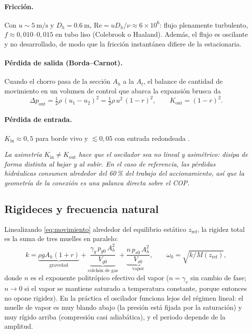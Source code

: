 \documentclass[11pt,a4paper]{article}
\newenvironment{nota}{\par\smallskip\noindent\begin{minipage}{\linewidth}\small\itshape}{\end{minipage}\par\smallskip}
\begin{document}
\paragraph{Fricción.} Con $u\sim\SI{5}{\metre\per\second}$ y $D_h=\SI{0.6}{\metre}$, $\mathrm{Re}=uD_h/\nu\approx 6\times10^{6}$: flujo plenamente turbulento, $f\approx 0{,}010$--$0{,}015$ en tubo liso (Colebrook o Haaland). Además, el flujo es oscilante y no desarrollado, de modo que la fricción instantánea difiere de la estacionaria.

\paragraph{Pérdida de salida (Borda--Carnot).} Cuando el chorro pasa de la sección $A_h$ a la $A_t$, el balance de cantidad de movimiento en un volumen de control que abarca la expansión brusca da
\begin{equation}
\Delta p_{\mathrm{out}} = \tfrac12\rho\,(u_1-u_2)^2 = \tfrac12\rho\,u^2\,(1-r)^2,\qquad K_{\mathrm{out}}=(1-r)^2 .
\end{equation}
\paragraph{Pérdida de entrada.} $K_{\mathrm{in}}\approx 0{,}5$ para borde vivo y $\lesssim 0{,}05$ con entrada redondeada \cite{idelchik}.

\begin{nota}
La asimetría $K_{\mathrm{in}}\neq K_{\mathrm{out}}$ hace que el oscilador sea no lineal y asimétrico: disipa de forma distinta al bajar y al subir. En el caso de referencia, las pérdidas hidráulicas consumen alrededor del 60\,\% del trabajo del accionamiento, así que la geometría de la conexión es una palanca directa sobre el COP.
\end{nota}

\subsection{Rigideces y frecuencia natural}

Linealizando \eqref{eq:movimiento} alrededor del equilibrio estático $z_{\mathrm{ref}}$, la rigidez total es la suma de tres muelles en paralelo:
\begin{equation}
k = \underbrace{\rho g A_h (1+r)}_{\text{gravedad}} + \underbrace{\frac{\gamma_g\,p_{g0}\,A_h^2}{V_{g0}}}_{\text{colchón de gas}} + \underbrace{\frac{n\,p_{s0}\,A_h^2}{V_{s0}}}_{\text{vapor}},
\qquad \omega_0 = \sqrt{k/M(z_{\mathrm{ref}})},
\end{equation}
donde $n$ es el exponente politrópico efectivo del vapor ($n=\gamma_v$ sin cambio de fase; $n\to 0$ si el vapor se mantiene saturado a temperatura constante, porque entonces no opone rigidez). En la práctica el oscilador funciona lejos del régimen lineal: el muelle de vapor es muy blando abajo (la presión está fijada por la saturación) y muy rígido arriba (compresión casi adiabática), y el periodo depende de la amplitud.
\end{document}
